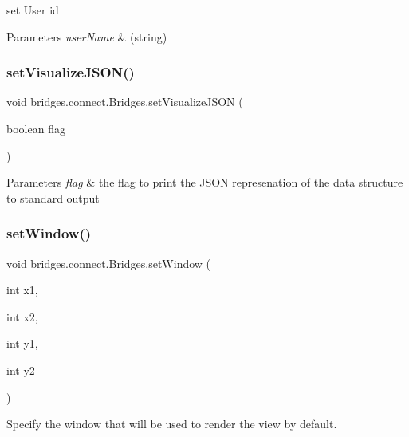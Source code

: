 set User id


\begin{DoxyParams}{Parameters}
{\em user\+Name} & (string) \\
\hline
\end{DoxyParams}
\mbox{\label{classbridges_1_1connect_1_1_bridges_aa502aa32a9ac482da9c8455c6810b64d}} 
\subsubsection{\texorpdfstring{setVisualizeJSON()}{setVisualizeJSON()}}
{\footnotesize\ttfamily void bridges.\+connect.\+Bridges.\+set\+Visualize\+J\+S\+ON (\begin{DoxyParamCaption}\item[{boolean}]{flag }\end{DoxyParamCaption})}


\begin{DoxyParams}{Parameters}
{\em flag} & the flag to print the J\+S\+ON represenation of the data structure to standard output \\
\hline
\end{DoxyParams}
\mbox{\label{classbridges_1_1connect_1_1_bridges_ac2f9a8d7852e499a7ed3521f06d470bf}} 
\subsubsection{\texorpdfstring{setWindow()}{setWindow()}\hspace{0.1cm}{\footnotesize\ttfamily [1/3]}}
{\footnotesize\ttfamily void bridges.\+connect.\+Bridges.\+set\+Window (\begin{DoxyParamCaption}\item[{int}]{x1,  }\item[{int}]{x2,  }\item[{int}]{y1,  }\item[{int}]{y2 }\end{DoxyParamCaption})}



Specify the window that will be used to render the view by default. 

